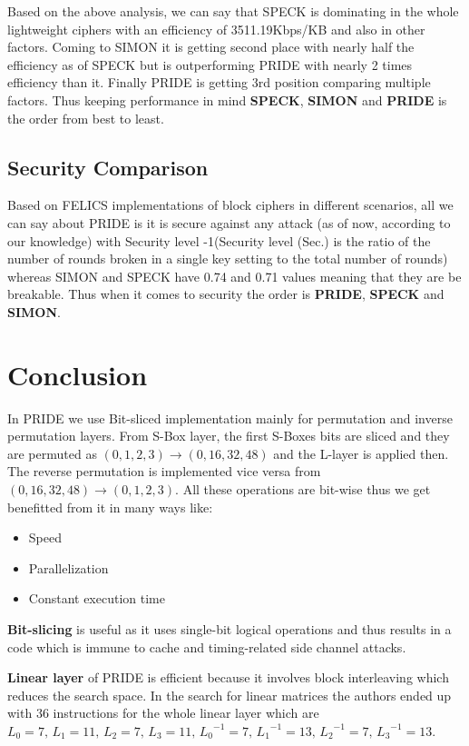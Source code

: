 \documentclass{transcrypto}
\begin{document}
	Based on the above analysis, we can say that SPECK is dominating in the whole lightweight ciphers with an efficiency of 3511.19Kbps/KB and also in other factors. Coming to SIMON it is getting second place with nearly half the efficiency as of SPECK but is outperforming PRIDE with nearly 2 times efficiency than it. Finally PRIDE is getting 3rd position comparing multiple factors. Thus keeping performance in mind \textbf{SPECK}, \textbf{SIMON} and \textbf{PRIDE} is the order from best to least.
	
	\subsection{Security Comparison}
	Based on FELICS implementations \cite{ciphers:2020} of block ciphers in different scenarios, all we can say about PRIDE is it is secure against any attack (as of now, according to our knowledge) with Security level -1(Security level (Sec.) is the ratio of the number of rounds broken in a single key setting to the total number of rounds) whereas SIMON and SPECK have 0.74 and 0.71 values meaning that they are be breakable. Thus when it comes to security the order is \textbf{PRIDE}, \textbf{SPECK} and \textbf{SIMON}.
	\newpage
	\section{Conclusion}
	In PRIDE we use Bit-sliced implementation mainly for permutation and inverse permutation layers. From S-Box layer, the first S-Boxes bits are sliced and they are permuted as $ (0,1,2,3) \rightarrow (0,16,32,48) $ and the L-layer is applied then. The reverse permutation is implemented vice versa from $ (0,16,32,48) \rightarrow (0,1,2,3) $. All these operations are bit-wise thus we get benefitted from it in many ways like:
	\begin{itemize}
		\item Speed
		\item Parallelization
		\item Constant execution time
	\end{itemize}

	\textbf{Bit-slicing} is useful as it uses single-bit logical operations and thus results in a code which is immune to cache and timing-related side channel attacks.
	
	\textbf{Linear layer} of PRIDE is efficient because it involves block interleaving which reduces the search space. In the search for linear matrices the authors ended up with 36 instructions for the whole linear layer which are $L_0=7,\,L_1=11,\,L_2=7,\,L_3=11,\,{L_0}^{-1}=7,\,{L_1}^{-1}=13,\,{L_2}^{-1}=7,\,{L_3}^{-1}=13$.
	
\end{document}
